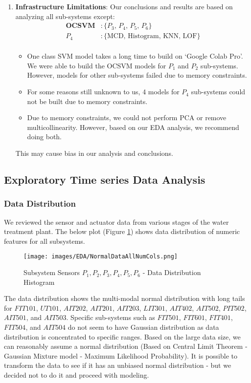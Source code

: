 \documentclass{article}
\begin{document}
\begin{enumerate}
    \item \label{infraLimit} \textbf{Infrastructure Limitations}: Our conclusions and results are based on analyzing all sub-systems except:
    $$
    \begin{aligned}
        \textbf{OCSVM} &: \{ \text{$P_3$, $P_4$, $P_5$, $P_6$}  \} \\
        \textbf{$P_4$} &: \{ \text{MCD, Histogram, KNN, LOF} \}   \\     
    \end{aligned}    
    $$
    \begin{itemize}
        \item One class SVM model takes a long time to build on `Google Colab Pro'. We were able to build the OCSVM models for $P_1$ and $P_2$ sub-systems. However, models for other sub-systems failed due to memory constraints.
        \item For some reasons still unknown to us, 4 models for $P_4$ sub-systems could not be built due to memory constraints.
        \item Due to memory constraints, we could not perform PCA or remove multicollinearity. However, based on our EDA analysis, we recommend doing both. 
    \end{itemize}
    
    This may cause bias in our analysis and conclusions.    

\end{enumerate}

\subsection{Exploratory Time series Data Analysis} \label{EDA}
\subsubsection{Data Distribution}
    We reviewed the sensor and actuator data from various stages of the water treatment plant. The below plot (Figure \ref{fig:histogram}) shows data distribution of numeric features for all subsystems.
    \begin{figure}[!ht]
            \caption{Subsystem Sensors ${P_1, P_2, P_3, P_4, P_5, P_6}$ - Data Distribution Histogram}
            \label{fig:histogram}
                \texttt{[image: images/EDA/NormalDataAllNumCols.png]}
    \end{figure}

    The data distribution shows the multi-modal normal distribution with long tails for $FIT101$, $UT101$, $AIT202$, $AIT201$, $AIT203$, $LIT301$, $AIT402$, $AIT502$, $PIT502$, $AIT501$, and $AIT503$. Specific sub-systems such as $FIT501$, $FIT601$, $FIT401$, $FIT504$, and $AIT504$ do not seem to have Gaussian distribution as data distribution is concentrated to specific ranges. Based on the large data size, we can reasonably assume a normal distribution (Based on Central Limit Theorem - Gaussian Mixture model - Maximum Likelihood Probability). It is possible to transform the data to see if it has an unbiased normal distribution - but we decided not to do it and proceed with modeling.
\end{document}
